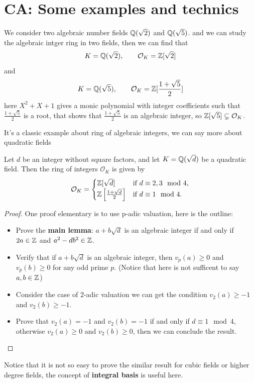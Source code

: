 \documentclass[12pt,a4paper]{article}
\begin{document}
\section{ CA: Some examples and technics}
\begin{example}
    We consider two algebraic number fields \(\mathbb{Q}(\sqrt{2})\) and \(\mathbb{Q}(\sqrt{5})\). and we can study the algebraic intger ring in two fields, then we can find that
    \[K = \mathbb{Q}(\sqrt{2}), \qquad \mathcal{O}_K  = \mathbb{Z}[\sqrt{2}]\]
    and 
    \[K = \mathbb{Q}(\sqrt{5}), \qquad \mathcal{O}_K  = \mathbb{Z}[\frac{1+\sqrt{5}}{2}]\]
    here \(X^2+X+1\) gives a monic polynomial with integer coefficients such that \(\frac{1+\sqrt{5}}{2}\) is a root, that shows that \(\frac{1+\sqrt{5}}{2}\) is an algebraic integer, so \(\mathbb{Z}[\sqrt{5}] \subsetneq \mathcal{O}_K\).
\end{example}

It's a classic example about ring of algebraic integers, we can say more about quadratic fields

\begin{theorem}
    Let \(d\) be an integer without square factors, and let \(K = \mathbb{Q}(\sqrt{d})\) be a quadratic field. Then the ring of integers \(\mathcal{O}_K\) is given by
    \[
    \mathcal{O}_K = 
    \begin{cases}
        \mathbb{Z}[\sqrt{d}] & \text{if } d \equiv 2, 3 \mod 4, \\
        \mathbb{Z}\left[\frac{1 + \sqrt{d}}{2}\right] & \text{if } d \equiv 1 \mod 4.
    \end{cases}
    \]
\end{theorem}

\begin{proof}
    One proof elementary is to use p-adic valuation, here is the outline:
    \begin{itemize}
        \item Prove the \textbf{main lemma}: \(a+b\sqrt{d}\) is an algebraic integer if and only if \(2a \in \mathbb{Z}\) and \(a^2 - db^2 \in \mathbb{Z}\).
        \item Verify that if \(a+b\sqrt{d}\) is an algebraic integer, then \(v_p(a)\geq 0\) and \(v_p(b) \geq 0\) for any odd prime \(p\). (Notice that here is not sufficent to say \(a,b \in \mathbb{Z}\))
        \item Consider the case of 2-adic valuation we can get the condition \(v_2(a) \geq -1\) and \(v_2(b) \geq -1\).
        \item Prove that \(v_2(a) = -1 \) and \(v_2(b) = -1\) if and only if \(d \equiv 1 \mod 4\), otherwise \(v_2(a) \geq 0\) and \(v_2(b) \geq 0\), then we can conclude the result.
    \end{itemize}
\end{proof}
Notice that it is not so easy to prove the similar result for cubic fields or higher degree fields, the concept of \textbf{integral basis} is useful here.\\
\end{document}
